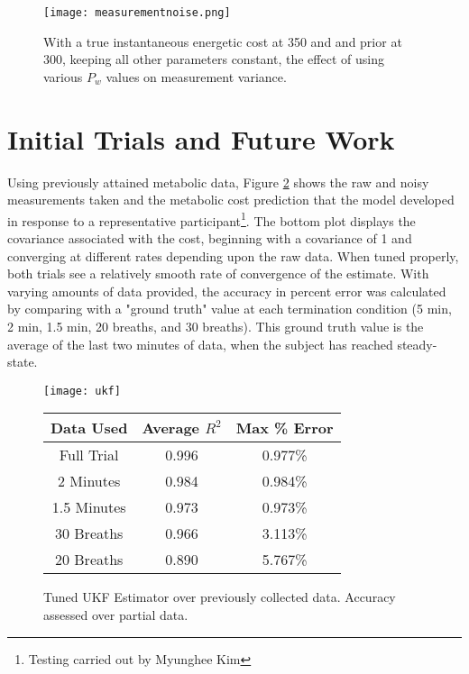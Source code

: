 \begin{figure}[t]
\centering
\texttt{[image: measurementnoise.png]}
\caption{With a true instantaneous energetic cost at 350 and and prior at 300, keeping all other parameters constant, the effect of using various $P_w$ values on measurement variance.}
\label{fig:measurementnoise}
\end{figure}

\section{Initial Trials and Future Work}
Using previously attained metabolic data, Figure \ref{fig:ukftuned} shows the raw and noisy measurements taken and the metabolic cost prediction that the model developed in response to a representative participant\footnote{Testing carried out by Myunghee Kim}. The bottom plot displays the covariance associated with the cost, beginning with a covariance of 1 and converging at different rates depending upon the raw data. When tuned properly, both trials see a relatively smooth rate of convergence of the estimate. With varying amounts of data provided, the accuracy in percent error was calculated by comparing with a "ground truth" value at each termination condition (5 min, 2 min, 1.5 min, 20 breaths, and 30 breaths). This ground truth value is the average of the last two minutes of data, when the subject has reached steady-state.

\begin{figure}[!ht]
\centering
\texttt{[image: ukf]}

\begin{tabular}{ |c|c|c| } 
 \hline
 Data Used & Average $R^2$ & Max \% Error \\ 
 \hline
 Full Trial & 0.996 & 0.977\% \\ 
 2 Minutes & 0.984 & 0.984\% \\ 
 1.5 Minutes & 0.973 & 0.973\% \\ 
 30 Breaths & 0.966 & 3.113\% \\ 
 20 Breaths & 0.890 & 5.767\% \\ 
 \hline
\end{tabular}%
\caption{Tuned UKF Estimator over previously collected data. Accuracy assessed over partial data.}
\label{fig:ukftuned}
\end{figure}

